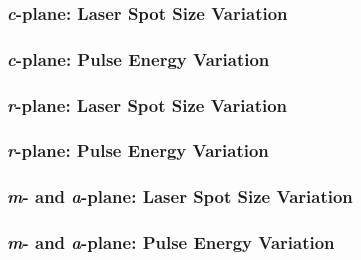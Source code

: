         \subsubsection{\textit{c}-plane: Laser Spot Size Variation}
            
        \subsubsection{\textit{c}-plane: Pulse Energy Variation}
            
        \subsubsection{\textit{r}-plane: Laser Spot Size Variation}
            
        \subsubsection{\textit{r}-plane: Pulse Energy Variation}
            
        \subsubsection{\textit{m}- and \textit{a}-plane: Laser Spot Size Variation}
            
        \subsubsection{\textit{m}- and \textit{a}-plane: Pulse Energy Variation}
            